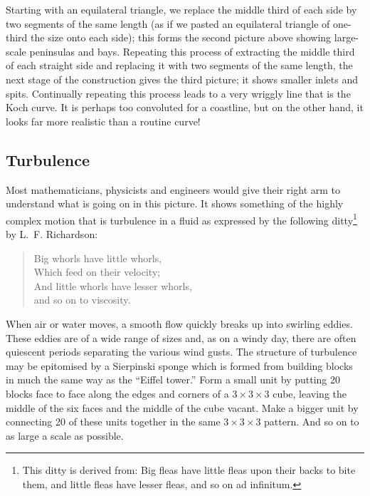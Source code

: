 \documentclass[12pt,a5paper]{article}
\begin{document}
Starting with an equilateral triangle, we replace the middle third of 
each side by two segments of the same length (as if we pasted an 
equilateral triangle of one-third the size onto each side); this 
forms the second picture above showing large-scale peninsulas and 
bays.  Repeating this process of extracting the middle third of each 
straight side and replacing it with two segments of the same length, 
the next stage of the construction gives the third picture; it shows 
smaller inlets and spits.  Continually repeating this process leads 
to a very wriggly line that is the Koch curve.  It is perhaps too 
convoluted for a coastline, but on the other hand, it looks far more 
realistic than a routine curve!

\subsection{Turbulence}
\label{ssturb}

Most mathematicians, physicists and engineers would give their right 
arm to understand what is going on in this picture.  It shows 
something of the highly complex motion that is turbulence in a fluid 
as expressed by the following ditty\footnote{This ditty is derived 
from: Big fleas have little fleas upon their backs to bite them, and 
little fleas have lesser fleas, and so on ad infinitum.} by L.~F. Richardson:
\begin{verse}
	Big whorls have little whorls,\\
	Which feed on their velocity;\\
	And little whorls have lesser whorls,\\
	and so on to viscosity.
\end{verse}

When air or water moves, a smooth flow quickly breaks up into 
swirling eddies.  These eddies are of a wide range of sizes and, as 
on a windy day, there are often quiescent periods separating the 
various wind gusts.  The structure of turbulence may be epitomised by 
a Sierpinski sponge which is formed from building blocks in much the 
same way as the ``Eiffel tower.''  Form a small unit by putting 20 
blocks face to face along the edges and corners of a $3\times 
3\times 3$ cube, 
leaving the middle of the six faces and the middle of the cube 
vacant.  Make a bigger unit by connecting 20 of these units together 
in the same 
\(
	3\times 3\times 3
\)
 pattern.  And so on to as large a scale as possible.
 
 
\end{document}
